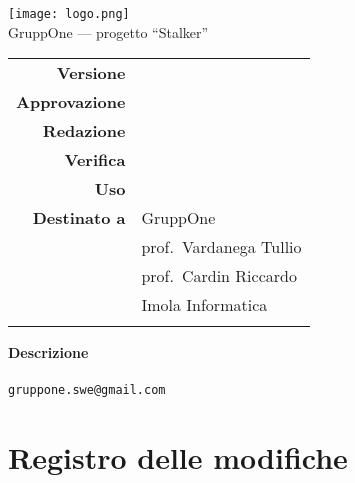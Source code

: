 
\thispagestyle{empty}

\begin{center}

  \texttt{[image: logo.png]}\\
  {\Large GruppOne --- progetto ``Stalker''}\\
  \vspace{1.5cm}

  {\Huge \thetitle}
  \vspace{1.5cm}

  \begin{table}[H]
    \centering

    \begin{tabular}{r|l} %
      \textbf{Versione}                   & \versione{}             \\
      \textbf{Approvazione}               & \responsabile{}         \\
      \textbf{Redazione}                  & \redattori{}            \\
      \textbf{Verifica}                   & \verificatori{}         \\
      \textbf{Uso}                        & \uso{}                  \\
      \textbf{Destinato a}
                                          & GruppOne                \\
                                          & prof.\ Vardanega Tullio \\
                                          & prof.\ Cardin Riccardo  \\
      \ifthenelse{\equal{\uso}{Esterno}}{ & Imola Informatica       \\ }{}
    \end{tabular}
  \end{table}

  \vfill
  \textbf{Descrizione}\\
  \descrizione{}\\
  \verb|gruppone.swe@gmail.com|
\end{center}

\newpage
\pagestyle{nopage}

\section*{Registro delle modifiche}%
\label{sec:registro_delle_modifiche}

